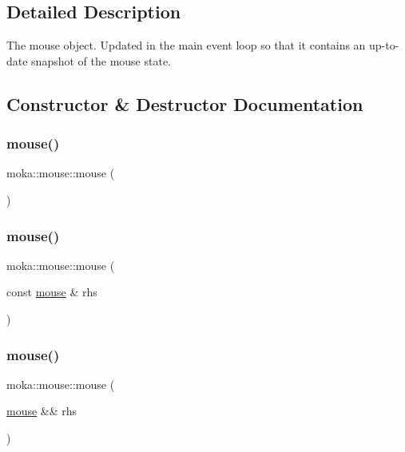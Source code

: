 \subsection{Detailed Description}
The mouse object. Updated in the main event loop so that it contains an up-\/to-\/date snapshot of the mouse state. 

\subsection{Constructor \& Destructor Documentation}
\mbox{\label{classmoka_1_1mouse_aeaf835849e5053f0f90ef725d99d4781}} 
\subsubsection{\texorpdfstring{mouse()}{mouse()}\hspace{0.1cm}{\footnotesize\ttfamily [1/3]}}
{\footnotesize\ttfamily moka\+::mouse\+::mouse (\begin{DoxyParamCaption}{ }\end{DoxyParamCaption})\hspace{0.3cm}{\ttfamily [default]}}

\mbox{\label{classmoka_1_1mouse_a0928a60ff721056d5e86d0ef84fdb6ff}} 
\subsubsection{\texorpdfstring{mouse()}{mouse()}\hspace{0.1cm}{\footnotesize\ttfamily [2/3]}}
{\footnotesize\ttfamily moka\+::mouse\+::mouse (\begin{DoxyParamCaption}\item[{const \mbox{\hyperlink{classmoka_1_1mouse}{mouse}} \&}]{rhs }\end{DoxyParamCaption})\hspace{0.3cm}{\ttfamily [delete]}}

\mbox{\label{classmoka_1_1mouse_af267ff2c984d9cc478341e9e5b42152f}} 
\subsubsection{\texorpdfstring{mouse()}{mouse()}\hspace{0.1cm}{\footnotesize\ttfamily [3/3]}}
{\footnotesize\ttfamily moka\+::mouse\+::mouse (\begin{DoxyParamCaption}\item[{\mbox{\hyperlink{classmoka_1_1mouse}{mouse}} \&\&}]{rhs }\end{DoxyParamCaption})\hspace{0.3cm}{\ttfamily [delete]}}

